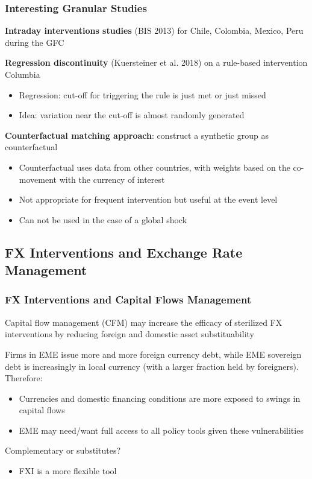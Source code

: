 \documentclass{beamer}
\newenvironment{wideitemize}{\itemize\addtolength{\itemsep}{10pt}}{\enditemize}
\begin{document}
\begin{frame}
  \frametitle{Interesting Granular Studies}
  \begin{wideitemize}
  \item \textbf{Intraday interventions studies} (BIS 2013) for Chile, Colombia, Mexico, Peru during the GFC
  \item \textbf{Regression discontinuity} (Kuersteiner et al. 2018) on a rule-based intervention Columbia
    \begin{itemize}
    \item Regression: cut-off for triggering the rule is just met or just missed
    \item Idea: variation near the cut-off is almost randomly generated
    \end{itemize}
  \item \textbf{Counterfactual matching approach}: construct a synthetic group as counterfactual
    \begin{itemize}
    \item Counterfactual uses data from other countries, with weights based on the co-movement with the currency of interest            
    \item Not appropriate for frequent intervention but useful at the event level
    \item Can not be used in the case of a global shock
    \end{itemize}
    
  \end{wideitemize}
\end{frame}




\subsection{FX Interventions and Exchange Rate Management}

\begin{frame}
  \frametitle{FX Interventions and Capital Flows Management}
  \begin{wideitemize}
    \item Capital flow management (CFM) may increase the efficacy of sterilized FX interventions by reducing foreign and domestic asset substituability
    \item Firms in EME issue more and more foreign currency debt, while EME sovereign debt is increasingly in local currency (with a larger fraction held by foreigners). Therefore:
      \begin{itemize}
      \item Currencies and domestic financing conditions are more exposed to swings in capital flows
      \item EME may need/want full access to all policy tools given these vulnerabilities
      \end{itemize}
    \item Complementary or substitutes?
      \begin{itemize}
      \item FXI is a more flexible tool
      \end{itemize}
  \end{wideitemize}
\end{frame}
\end{document}
